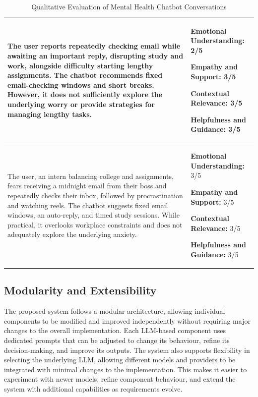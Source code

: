 \documentclass[conference]{IEEEtran}
\begin{document}
\begin{table}[ht]
\begin{tabularx}{\textwidth}{
|>{\raggedright\arraybackslash}X|
>{\raggedright\arraybackslash}p{}|
}
The user reports repeatedly checking email while awaiting an important reply, disrupting study and work, alongside difficulty starting lengthy assignments. The chatbot recommends fixed email-checking windows and short breaks. However, it does not sufficiently explore the underlying worry or provide strategies for managing lengthy tasks.
&
\textbf{Emotional Understanding:} 2/5 \par
\textbf{Empathy and Support:} 3/5 \par
\textbf{Contextual Relevance:} 3/5 \par
\textbf{Helpfulness and Guidance:} 3/5
\\
\hline

The user, an intern balancing college and assignments, fears receiving a midnight email from their boss and repeatedly checks their inbox, followed by procrastination and watching reels. The chatbot suggests fixed email windows, an auto-reply, and timed study sessions. While practical, it overlooks workplace constraints and does not adequately explore the underlying anxiety.
&
\textbf{Emotional Understanding:} 3/5 \par
\textbf{Empathy and Support:} 3/5 \par
\textbf{Contextual Relevance:} 3/5 \par
\textbf{Helpfulness and Guidance:} 3/5
\\
\hline

\end{tabularx}
\caption{Qualitative Evaluation of Mental Health Chatbot Conversations}
\label{tab:conversation_evaluation}
\end{table}
\subsection{Modularity and Extensibility}
The proposed system follows a modular architecture, allowing individual components to be modified and improved independently without requiring major changes to the overall implementation. Each LLM-based component uses dedicated prompts that can be adjusted to change its behaviour, refine its decision-making, and improve its outputs. The system also supports flexibility in selecting the underlying LLM, allowing different models and providers to be integrated with minimal changes to the implementation. This makes it easier to experiment with newer models, refine component behaviour, and extend the system with additional capabilities as requirements evolve.
\end{document}
